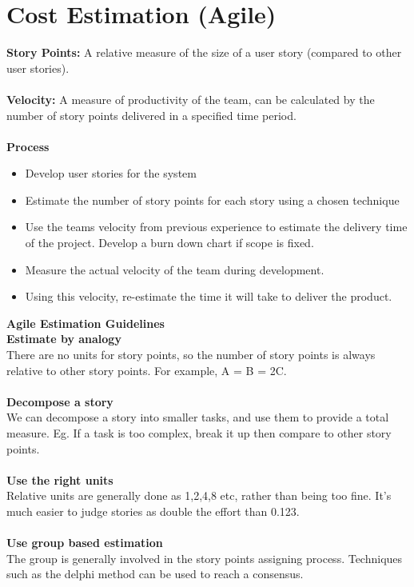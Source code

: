 \documentclass[a4paper,10pt]{article}
\begin{document}
\section*{Cost Estimation (Agile)}
\textcolor{BlueGreen}{\textbf{Story Points:}} A relative measure of the size of a user story (compared to other user stories). \\\\
\textcolor{BlueGreen}{\textbf{Velocity:}} A measure of productivity of the team, can be calculated by the number of story points delivered in a specified time period. \\\\
\textcolor{BlueGreen}{\textbf{Process}}
\begin{itemize}
	\item Develop user stories for the system 
	\item Estimate the number of story points for each story using a chosen technique 
	\item Use the teams velocity from previous experience to estimate the delivery time of the project. Develop a burn down chart if scope is fixed. 
	\item Measure the actual velocity of the team during development. 
	\item Using this velocity, re-estimate the time it will take to deliver the product. \\
\end{itemize}
\textcolor{BlueGreen}{\textbf{Agile Estimation Guidelines}} \\
\textbf{Estimate by analogy} \\
There are no units for story points, so the number of story points is always relative to other story points. For example, A = B = 2C.  \\\\
\textbf{Decompose a story} \\
We can decompose a story into smaller tasks, and use them to provide a total measure. Eg. If a task is too complex, break it up then compare to other story points. \\\\
\textbf{Use the right units} \\ 
Relative units are generally done as 1,2,4,8 etc, rather than being too fine. It's much easier to judge stories as double the effort than 0.123. \\\\
\textbf{Use group based estimation} \\
The group is generally involved in the story points assigning process. Techniques such as the delphi method can be used to reach a consensus. \\\\
\end{document}

